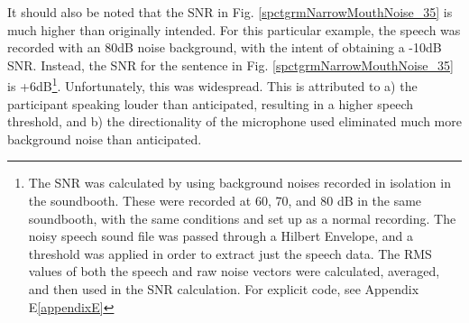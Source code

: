 It should also be noted that the SNR in Fig. \ref{spctgrmNarrowMouthNoise_35} is much higher than originally intended.  For this particular example, the speech was recorded with an 80dB noise background, with the intent of obtaining a -10dB SNR.  Instead, the SNR for the sentence in Fig. \ref{spctgrmNarrowMouthNoise_35} is +6dB\footnote{The SNR was calculated by using background noises recorded in isolation in the soundbooth.  These were recorded at 60, 70, and 80 dB in the same soundbooth, with the same conditions and set up as a normal recording.  The noisy speech sound file was passed through a Hilbert Envelope, and a threshold was applied in order to extract just the speech data.  The RMS values of both the speech and raw noise vectors were calculated, averaged, and then used in the SNR calculation.  For explicit code, see Appendix E\ref{appendixE}}.  Unfortunately, this was widespread. This is attributed to a) the participant speaking louder than anticipated, resulting in a higher speech threshold, and b) the directionality of the microphone used eliminated much more background noise than anticipated.

